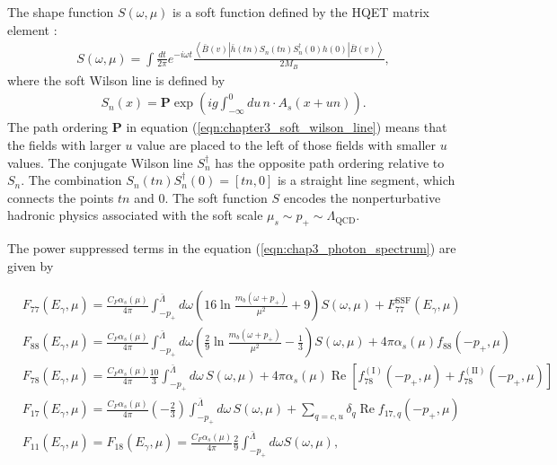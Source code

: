 The shape function $S(\omega,\mu)$ is a soft function defined by the HQET matrix element \cite{Neubert:1993um}: 
\begin{eqnarray}\label{eqn:chapter3_leading_order_shape_function}
S(\omega, \mu)=\int \frac{d t}{2 \pi} e^{-i \omega t} \frac{\left\langle\bar{B}(v)\left|\bar{h}(t n) S_{n}(t n) S_{n}^{\dagger}(0) h(0)\right| \bar{B}(v)\right\rangle}{2 M_{B}},
\end{eqnarray}  
where the soft Wilson line is defined by
\begin{eqnarray}\label{eqn:chapter3_soft_wilson_line}
S_{n}(x)=\mathbf{P} \exp \left(i g \int_{-\infty}^{0} d u\, n \cdot A_{s}(x+u n)\right).
\end{eqnarray}
The path ordering $\textbf{P}$ in equation (\ref{eqn:chapter3_soft_wilson_line}) means that the fields with larger $u$ value are placed to the left of those fields with smaller $u$ values. The conjugate Wilson line $S^{\dagger}_n$ has the opposite path ordering relative to $S_n$. The combination $S_{n}(t n) S_{n}^{\dagger}(0)=[t n, 0]$ is a straight line segment, which connects the points $tn$ and $0$. The soft function $S$ encodes the nonperturbative hadronic physics associated with the soft scale $\mu_{s} \sim p_{+} \sim \Lambda_{\mathrm{QCD}}$.\par
The power suppressed terms in the equation (\ref{eqn:chap3_photon_spectrum}) are given by \cite{Benzke:2010js}

\begin{align}\label{eqn:chapter3_power_suppressed_terms}
&F_{77}\left(E_{\gamma}, \mu\right)=\frac{C_{F} \alpha_{s}(\mu)}{4 \pi} \int_{-p_{+}}^{\bar{\Lambda}} d \omega\left(16 \ln \frac{m_{b}\left(\omega+p_{+}\right)}{\mu^{2}}+9\right) S(\omega, \mu)+F_{77}^{\mathrm{SSF}}\left(E_{\gamma}, \mu\right)\nonumber\\
&F_{88}\left(E_{\gamma}, \mu\right)=\frac{C_{F} \alpha_{s}(\mu)}{4 \pi} \int_{-p_{+}}^{\bar{\Lambda}} d \omega\left(\frac{2}{9} \ln \frac{m_{b}\left(\omega+p_{+}\right)}{\mu^{2}}-\frac{1}{3}\right) S(\omega, \mu)+4 \pi \alpha_{s}(\mu) f_{88}\left(-p_{+}, \mu\right)\nonumber\\
&F_{78}\left(E_{\gamma}, \mu\right)=\frac{C_{F} \alpha_{s}(\mu)}{4 \pi} \frac{10}{3} \int_{-p_{+}}^{\bar{\Lambda}} d \omega\, S(\omega, \mu)+4 \pi \alpha_{s}(\mu) \operatorname{Re}\left[f_{78}^{(\mathrm{I})}\left(-p_{+}, \mu\right)+f_{78}^{(\mathrm{II})}\left(-p_{+}, \mu\right)\right]\nonumber\\
&F_{17}\left(E_{\gamma}, \mu\right)=\frac{C_{F} \alpha_{s}(\mu)}{4 \pi}\left(-\frac{2}{3}\right) \int_{-p_{+}}^{\bar{\Lambda}} d \omega\, S(\omega, \mu)+\sum_{q=c, u} \delta_{q} \operatorname{Re} f_{17, q}\left(-p_{+}, \mu\right)\nonumber\\
&F_{11}\left(E_{\gamma}, \mu\right)=F_{18}\left(E_{\gamma}, \mu\right)=\frac{C_{F} \alpha_{s}(\mu)}{4 \pi} \frac{2}{9} \int_{-p_{+}}^{\bar{\Lambda}} d \omega S(\omega, \mu),
\end{align}

